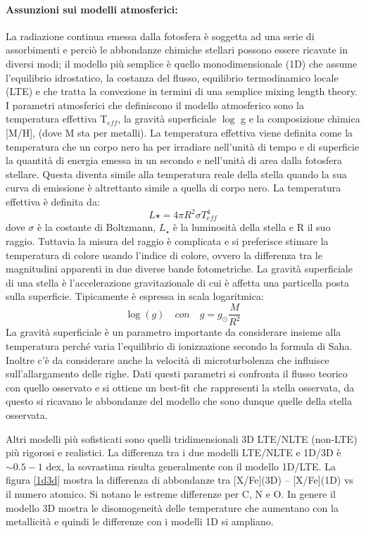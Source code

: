 \documentclass[12pt]{article}
\begin{document}
\paragraph{Assunzioni sui modelli atmosferici:} La radiazione continua emessa dalla fotosfera è soggetta ad una serie di assorbimenti e perciò le abbondanze chimiche stellari possono essere ricavate in diversi modi; il modello più semplice è quello monodimensionale (1D) che assume l’equilibrio idrostatico, la costanza del flusso, equilibrio termodinamico locale (LTE) e che tratta la convezione in termini di una semplice mixing length theory. I parametri atmosferici che definiscono il modello atmosferico sono la temperatura effettiva T$_{eff}$, la gravità superficiale $\log$ g e la composizione chimica [M/H], (dove M sta per metalli). 
La temperatura effettiva viene definita come la temperatura che un corpo nero ha per irradiare nell'unità di tempo e di superficie la quantità di energia emessa in un secondo e nell'unità di area dalla fotosfera stellare. Questa diventa simile alla temperatura reale della stella quando la sua curva di emissione è altrettanto simile a quella di corpo nero. La temperatura effettiva è definita da:
 \begin{equation}
  L\star=4\pi R^{2}\sigma T^{4}_{eff}
\end{equation}
dove $\sigma$ è la costante di Boltzmann, $L_\star$ è la luminosità della stella e R il suo raggio. Tuttavia la misura del raggio è complicata e si preferisce stimare la temperatura di colore usando l'indice di colore, ovvero la differenza tra le magnitudini apparenti in due diverse bande fotometriche.
La gravità superficiale di una stella è l'accelerazione gravitazionale di cui è affetta una particella posta sulla superficie. Tipicamente è espressa in scala logaritmica:
\begin{equation}
  \log(g)\quad \textit{con} 	\quad g=g_\odot \frac{M}{R^2}
\end{equation}
La gravità superficiale è un parametro importante da considerare insieme alla temperatura perché varia l'equilibrio di ionizzazione secondo la formula di Saha. \\ Inoltre c'è da considerare anche la velocità di microturbolenza che influisce sull'allargamento delle righe.
Dati questi parametri si confronta il flusso teorico con quello osservato e si ottiene un best-fit che rappresenti la stella osservata, da questo si ricavano le abbondanze del modello che sono dunque quelle della stella osservata.

Altri modelli più sofisticati sono quelli tridimensionali 3D LTE/NLTE (non-LTE) più rigorosi e realistici. La differenza tra i due modelli LTE/NLTE e 1D/3D è $\sim 0.5-1$ dex, la sovrastima risulta generalmente con il modello 1D/LTE. La figura \ref{1d3d} mostra la differenza di abbondanze tra [X/Fe](3D) – [X/Fe](1D) vs il numero atomico. Si notano le estreme differenze per C, N e O.
In genere il modello 3D mostra le disomogeneità delle temperature che aumentano con la metallicità e quindi le differenze con i modelli 1D si ampliano.
\end{document}
